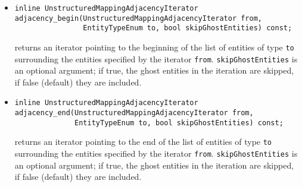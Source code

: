 \begin{itemize}
\item \begin{verbatim}
inline UnstructuredMappingAdjacencyIterator 
adjacency_begin(UnstructuredMappingAdjacencyIterator from, 
                EntityTypeEnum to, bool skipGhostEntities) const;
\end{verbatim}
returns an iterator pointing to the beginning of the list of entities of type {\tt to} surrounding the entities specified
by the iterator {\tt from}.  {\tt skipGhostEntities} is an optional argument; if true, the ghost 
entities in the iteration are skipped, if false (default) they are included.

\item \begin{verbatim}
inline UnstructuredMappingAdjacencyIterator 
adjacency_end(UnstructuredMappingAdjacencyIterator from, 
              EntityTypeEnum to, bool skipGhostEntities) const;
\end{verbatim}
returns an iterator pointing to the end of the list of entities of type {\tt to} surrounding the entities specified
by the iterator {\tt from}.  {\tt skipGhostEntities} is an optional argument; if true, the ghost 
entities in the iteration are skipped, if false (default) they are included.
\end{itemize}

